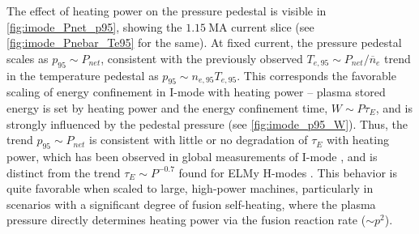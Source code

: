\begin{figure}[t]
 \pushtooutside
\end{figure}

The effect of heating power on the pressure pedestal is visible in \cref{fig:imode_Pnet_p95}, showing the $\SI{1.15}{\mega\ampere}$ current slice (see \cref{fig:imode_Pnebar_Te95} for the same).  At fixed current, the pressure pedestal scales as $p_{95} \sim P_{net}$, consistent with the previously observed $T_{e,95} \sim P_{net}/\overline{n}_e$ trend in the temperature pedestal as $p_{95} \sim n_{e,95} T_{e,95}$.  This corresponds the favorable scaling of energy confinement in I-mode with heating power -- plasma stored energy is set by heating power and the energy confinement time, $W \sim P \tau_E$, and is strongly influenced by the pedestal pressure (see \cref{fig:imode_p95_W}).  Thus, the trend $p_{95} \sim P_{net}$ is consistent with little or no degradation of $\tau_E$ with heating power, which has been observed in global measurements of I-mode \cite{Dominguez2012,Whyte2010}, and is distinct from the trend $\tau_E \sim P^{-0.7}$ found for ELMy H-modes \cite{ITER1999}.  This behavior is quite favorable when scaled to large, high-power machines, particularly in scenarios with a significant degree of fusion self-heating, where the plasma pressure directly determines heating power via the fusion reaction rate ($\sim p^2$).

